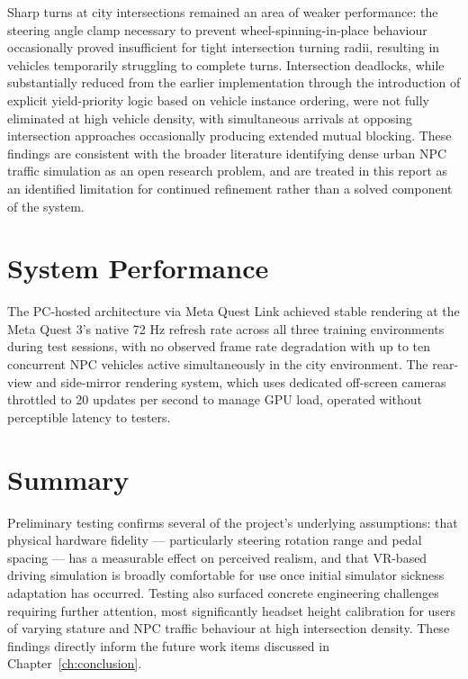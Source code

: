 Sharp turns at city intersections remained an area of weaker performance: the steering angle clamp necessary to prevent wheel-spinning-in-place behaviour occasionally proved insufficient for tight intersection turning radii, resulting in vehicles temporarily struggling to complete turns. Intersection deadlocks, while substantially reduced from the earlier implementation through the introduction of explicit yield-priority logic based on vehicle instance ordering, were not fully eliminated at high vehicle density, with simultaneous arrivals at opposing intersection approaches occasionally producing extended mutual blocking. These findings are consistent with the broader literature identifying dense urban NPC traffic simulation as an open research problem, and are treated in this report as an identified limitation for continued refinement rather than a solved component of the system.

\section{System Performance}

The PC-hosted architecture via Meta Quest Link achieved stable rendering at the Meta Quest 3's native 72 Hz refresh rate across all three training environments during test sessions, with no observed frame rate degradation with up to ten concurrent NPC vehicles active simultaneously in the city environment. The rear-view and side-mirror rendering system, which uses dedicated off-screen cameras throttled to 20 updates per second to manage GPU load, operated without perceptible latency to testers.

\section{Summary}

Preliminary testing confirms several of the project's underlying assumptions: that physical hardware fidelity — particularly steering rotation range and pedal spacing — has a measurable effect on perceived realism, and that VR-based driving simulation is broadly comfortable for use once initial simulator sickness adaptation has occurred. Testing also surfaced concrete engineering challenges requiring further attention, most significantly headset height calibration for users of varying stature and NPC traffic behaviour at high intersection density. These findings directly inform the future work items discussed in Chapter~\ref{ch:conclusion}.